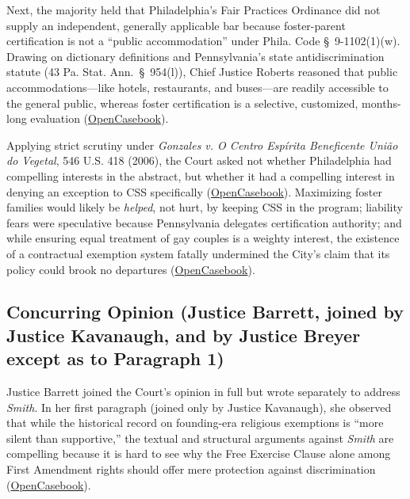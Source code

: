 \documentclass[12pt]{article}
\begin{document}
Next, the majority held that Philadelphia's Fair Practices Ordinance did not supply an independent, generally applicable bar because foster-parent certification is not a ``public accommodation'' under Phila. Code \S~9-1102(1)(w). Drawing on dictionary definitions and Pennsylvania's state antidiscrimination statute (43 Pa. Stat. Ann.~\S~954(l)), Chief Justice Roberts reasoned that public accommodations---like hotels, restaurants, and buses---are readily accessible to the general public, whereas foster certification is a selective, customized, months-long evaluation (\href{https://opencasebook.org/casebooks/4501-constitutional-law/resources/12.9-fulton-v-city-of-philadelphia-2020/}{OpenCasebook}).

Applying strict scrutiny under \textit{Gonzales v. O Centro Esp\'{i}rita Beneficente Uni\~{a}o do Vegetal}, 546 U.S. 418 (2006), the Court asked not whether Philadelphia had compelling interests in the abstract, but whether it had a compelling interest in denying an exception to CSS specifically (\href{https://opencasebook.org/casebooks/4501-constitutional-law/resources/12.9-fulton-v-city-of-philadelphia-2020/}{OpenCasebook}). Maximizing foster families would likely be \emph{helped}, not hurt, by keeping CSS in the program; liability fears were speculative because Pennsylvania delegates certification authority; and while ensuring equal treatment of gay couples is a weighty interest, the existence of a contractual exemption system fatally undermined the City's claim that its policy could brook no departures (\href{https://opencasebook.org/casebooks/4501-constitutional-law/resources/12.9-fulton-v-city-of-philadelphia-2020/}{OpenCasebook}).

\subsection{Concurring Opinion (Justice Barrett, joined by Justice Kavanaugh, and by Justice Breyer except as to Paragraph 1)}
Justice Barrett joined the Court's opinion in full but wrote separately to address \textit{Smith}. In her first paragraph (joined only by Justice Kavanaugh), she observed that while the historical record on founding-era religious exemptions is ``more silent than supportive,'' the textual and structural arguments against \textit{Smith} are compelling because it is hard to see why the Free Exercise Clause alone among First Amendment rights should offer mere protection against discrimination (\href{https://opencasebook.org/casebooks/4501-constitutional-law/resources/12.9-fulton-v-city-of-philadelphia-2020/}{OpenCasebook}).
\end{document}

